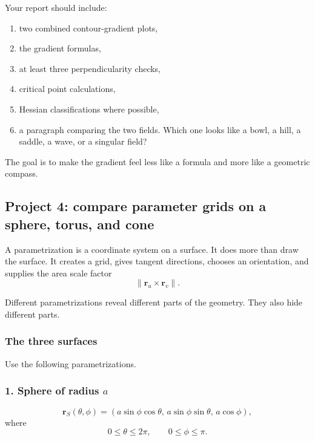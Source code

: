Your report should include:

\begin{enumerate}
\item two combined contour-gradient plots,

\item the gradient formulas,

\item at least three perpendicularity checks,

\item critical point calculations,

\item Hessian classifications where possible,

\item a paragraph comparing the two fields.  Which one looks like a bowl, a hill, a
saddle, a wave, or a singular field?
\end{enumerate}

The goal is to make the gradient feel less like a formula and more like a geometric
compass.

\subsection{Project 4: compare parameter grids on a sphere, torus, and cone}

A parametrization is a coordinate system on a surface.  It does more than draw the
surface.  It creates a grid, gives tangent directions, chooses an orientation, and
supplies the area scale factor
\[
    \|\mathbf r_u\times \mathbf r_v\|.
\]

Different parametrizations reveal different parts of the geometry.  They also hide
different parts.

\subsubsection*{The three surfaces}

Use the following parametrizations.

\subsubsection*{1. Sphere of radius \(a\)}

\[
    \mathbf r_S(\theta,\phi)
    =
    (a\sin\phi\cos\theta,\,
     a\sin\phi\sin\theta,\,
     a\cos\phi),
\]
where
\[
    0\le\theta\le2\pi,
    \qquad
    0\le\phi\le\pi.
\]

